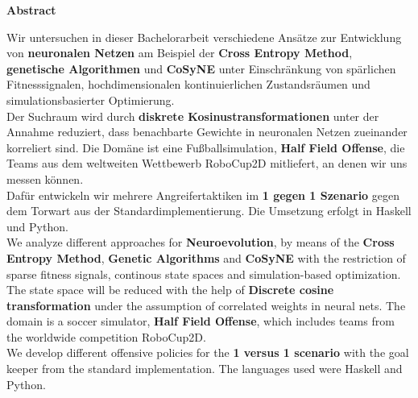 %
%
\vspace*{2cm}

\begin{center}
    \textbf{Abstract}
\end{center}

\vspace*{1cm}

\noindent Wir untersuchen in dieser Bachelorarbeit verschiedene Ansätze zur Entwicklung von \textbf{neuronalen Netzen} am Beispiel der \textbf{Cross Entropy Method}, \textbf{genetische Algorithmen} und \textbf{CoSyNE} unter Einschränkung von spärlichen Fitnesssignalen, hochdimensionalen kontinuierlichen Zustandsräumen und simulationsbasierter Optimierung. \\[2mm]
\noindent
Der Suchraum wird durch \textbf{diskrete Kosinustransformationen} unter der Annahme reduziert, dass benachbarte Gewichte in neuronalen Netzen zueinander korreliert sind. Die Domäne ist eine Fußballsimulation, \textbf{Half Field Offense}, die Teams aus dem weltweiten Wettbewerb RoboCup2D mitliefert, an denen wir uns messen können. \\[2mm]
\noindent
Dafür entwickeln wir mehrere Angreifertaktiken im \textbf{1 gegen 1 Szenario} gegen dem Torwart aus der Standardimplementierung. Die Umsetzung erfolgt in Haskell und Python. \\[10mm]


\noindent
We analyze different approaches for \textbf{Neuroevolution}, by means of the \textbf{Cross Entropy Method}, \textbf{Genetic Algorithms} and \textbf{CoSyNE} with the restriction of sparse fitness signals, continous state spaces and simulation-based optimization. \\[2mm]
\noindent
The state space will be reduced with the help of \textbf{Discrete cosine transformation} under the assumption of correlated weights in neural nets. The domain is a soccer simulator, \textbf{Half Field Offense}, which includes teams from the worldwide competition RoboCup2D. \\[2mm]
\noindent
We develop different offensive policies for the \textbf{1 versus 1 scenario} with the goal keeper from the standard implementation. The languages used were Haskell and Python.






